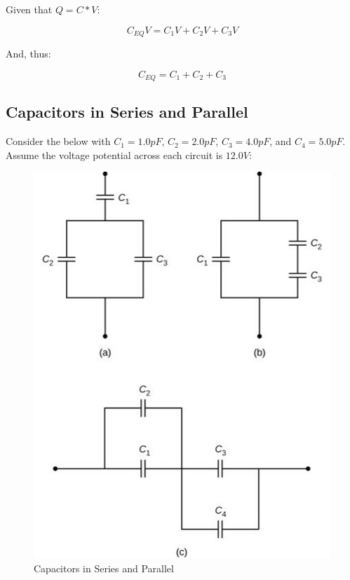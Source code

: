 \documentclass[14pt]{memoir}
\begin{document}
Given that $Q = C * V$:

\begin{equation}
C_{EQ}V = C_{1}V + C_{2}V + C_{3}V
\end{equation}

And, thus:

\begin{equation}
C_{EQ} = C_{1} + C_{2} + C_{3}
\end{equation}


\subsection{Capacitors in Series and Parallel}

Consider the below with $C_1 = 1.0 pF$, $C_2 = 2.0 pF$, $C_3 = 4.0 pF$, and $C_4 = 5.0 pF$. Assume the voltage potential across each circuit is $12.0V$:

\begin{figure}[H]
\begin{center}
\includegraphics[scale=0.50]{fig/fig_08_15.jpg}
\caption{Capacitors in Series and Parallel}
\label{fig:08_15}
\end{center}
\end{figure}
\end{document}
